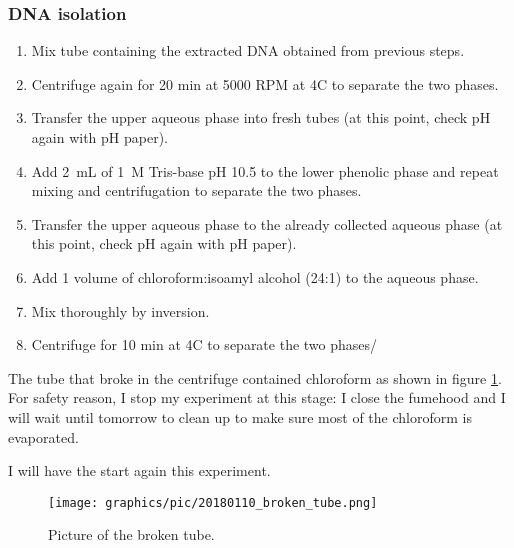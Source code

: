 \subsubsection{DNA isolation}
\begin{enumerate}
\item Mix tube containing the extracted DNA obtained from previous steps.
\item Centrifuge again for 20 min at 5000 RPM at 4\degree C to separate the two phases.
\item Transfer the upper aqueous phase into fresh tubes (at this point, check pH again with pH paper).
\item Add 2~mL of 1~M Tris-base pH 10.5 to the lower phenolic phase and repeat mixing and centrifugation to separate the two phases.
\item Transfer the upper aqueous phase to the already collected aqueous phase (at this point, check pH again with pH paper).
\item Add 1 volume of chloroform:isoamyl alcohol (24:1) to the aqueous phase.
\item Mix thoroughly by inversion.
\item Centrifuge for 10 min at 4\degree C to separate the two phases/
\end{enumerate}

The tube that broke in the centrifuge contained chloroform as shown in figure \ref{fig:20180110_broken_tube}. For safety reason, I stop my experiment at this stage: I close the fumehood and I will wait until tomorrow to clean up to make sure most of the chloroform is evaporated. 

I will have the start again this experiment.

\begin{figure}[H] %
    \centering
    \caption{Picture of the broken tube.}
    \label{fig:20180110_broken_tube}
    \texttt{[image: graphics/pic/20180110\_broken\_tube.png]}
\end{figure}

